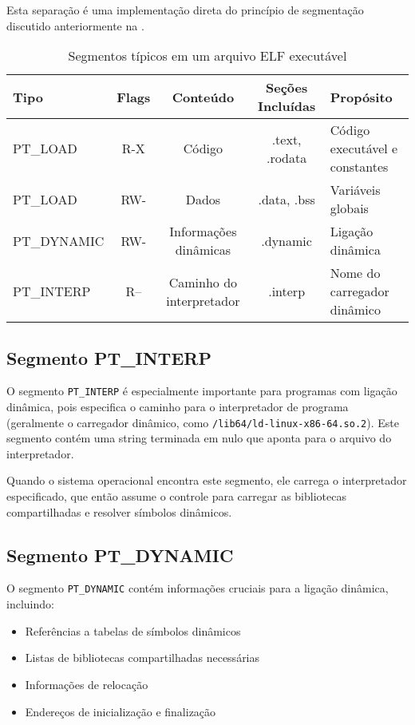 Esta separação é uma implementação direta do princípio de segmentação discutido anteriormente na .

\begin{table}[ht]
    \centering
    \caption{Segmentos típicos em um arquivo ELF executável}
    \label{tab:typical_segments}
    \begin{tabular}{|l|c|c|c|l|}
        \hline
        \textbf{Tipo} & \textbf{Flags} & \textbf{Conteúdo} & \textbf{Seções Incluídas} & \textbf{Propósito} \\
        \hline
        PT\_LOAD & R-X & Código & .text, .rodata & Código executável e constantes \\
        PT\_LOAD & RW- & Dados & .data, .bss & Variáveis globais \\
        PT\_DYNAMIC & RW- & Informações dinâmicas & .dynamic & Ligação dinâmica \\
        PT\_INTERP & R-- & Caminho do interpretador & .interp & Nome do carregador dinâmico \\
        \hline
    \end{tabular}
\end{table}

\subsection{Segmento PT\_INTERP}\label{subsec:pt_interp}

O segmento \texttt{PT\_INTERP} é especialmente importante para programas com ligação dinâmica, pois especifica o caminho para o interpretador de programa (geralmente o carregador dinâmico, como \texttt{/lib64/ld-linux-x86-64.so.2}). Este segmento contém uma string terminada em nulo que aponta para o arquivo do interpretador.

Quando o sistema operacional encontra este segmento, ele carrega o interpretador especificado, que então assume o controle para carregar as bibliotecas compartilhadas e resolver símbolos dinâmicos.

\subsection{Segmento PT\_DYNAMIC}\label{subsec:pt_dynamic}

O segmento \texttt{PT\_DYNAMIC} contém informações cruciais para a ligação dinâmica, incluindo:

\begin{itemize}
    \item Referências a tabelas de símbolos dinâmicos
    \item Listas de bibliotecas compartilhadas necessárias
    \item Informações de relocação
    \item Endereços de inicialização e finalização
\end{itemize}

